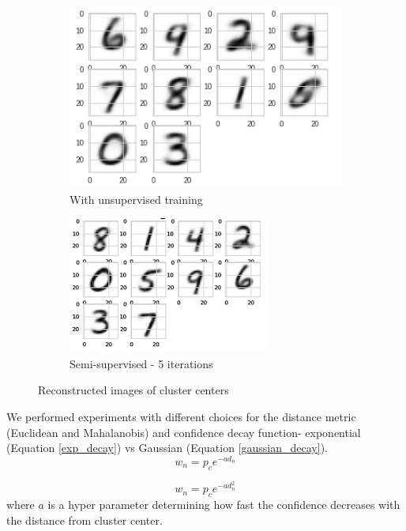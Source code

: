\documentclass{bmvc2k}
\begin{document}
\begin{figure}[!t]
\centering
\begin{subfigure}[t]{.45\textwidth}
  \centering
  \includegraphics[width=.5\linewidth]{images/cluster_centers_epoch_1_0_gmm.png}
  \caption{With unsupervised training}
  \label{cluster_center_1}
\end{subfigure}\hfill
\begin{subfigure}[t]{.45\textwidth}
  \centering
  \includegraphics[width=.5\linewidth]{images/cluster_centers_epoch_5_0_gmm.png}
  \caption{Semi-supervised - 5 iterations}
  \label{cluster_center_5}
\end{subfigure}
\vspace{0.1in}

\caption{Reconstructed images of cluster centers}
\label{cluster_center}
\end{figure}

We performed experiments with different choices for the distance metric (Euclidean and Mahalanobis) and confidence decay function- exponential (Equation \ref{exp_decay}) vs Gaussian (Equation \ref{gaussian_decay}).
\begin{equation}
    w_n = p_ce^{-a d_n}
    \label{exp_decay}
\end{equation}

\begin{equation}
    w_n = p_ce^{-a d_n^2}
    \label{gaussian_decay}
\end{equation}
where $a$ is a hyper parameter determining how fast the confidence decreases with the distance from cluster center.
\end{document}

